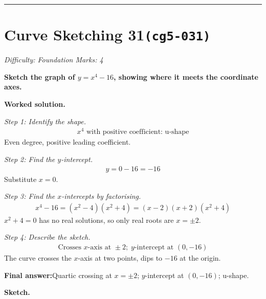 \documentclass[11pt]{article}
\newcommand{\question}[1]{\par\medskip\noindent\textbf{#1}\par}
\begin{document}
\medskip\hrule

\section*{Curve Sketching 31\quad\small\texttt{(cg5-031)}}
\textit{Difficulty: Foundation \quad\textbar\quad Marks: 4}

\question{Sketch the graph of \( y = x^4 - 16 \), showing where it meets the coordinate axes.}

\textbf{Worked solution.}

\textit{Step 1: Identify the shape.}
\[\begin{gathered}
x^4 \text{ with positive coefficient: u-shape}
\end{gathered}\]
Even degree, positive leading coefficient.

\textit{Step 2: Find the \( y \)-intercept.}
\[\begin{gathered}
y = 0 - 16 = -16
\end{gathered}\]
Substitute \( x = 0 \).

\textit{Step 3: Find the \( x \)-intercepts by factorising.}
\[\begin{gathered}
x^4 - 16 = (x^2 - 4)(x^2 + 4) = (x-2)(x+2)(x^2+4)
\end{gathered}\]
\( x^2 + 4 = 0 \) has no real solutions, so only real roots are \( x = \pm 2 \).

\textit{Step 4: Describe the sketch.}
\[\begin{gathered}
\text{Crosses } x\text{-axis at } \pm 2; \; y\text{-intercept at } (0,-16)
\end{gathered}\]
The curve crosses the \( x \)-axis at two points, dips to \( -16 \) at the origin.

\begin{answerbox}
\textbf{Final answer:}\quad Quartic crossing at \(\displaystyle x = \pm 2\); \(\displaystyle y\)-intercept at \(\displaystyle (0, -16)\); u-shape.
\end{answerbox}
\textbf{Sketch.}
\end{document}
